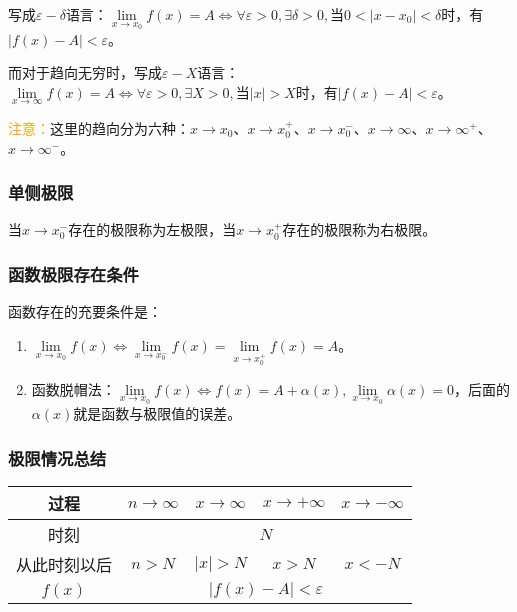 \documentclass[UTF8, 12pt]{ctexart}
\begin{document}
写成$\varepsilon-\delta$语言：$\lim\limits_{x\to x_0}f(x)=A\Leftrightarrow\forall\varepsilon>0,\exists\delta>0,\text{当}0<\vert x-x_0\vert<\delta$时，有$\vert f(x)-A\vert<\varepsilon$。

而对于趋向无穷时，写成$\varepsilon-X$语言：$\lim\limits_{x\to\infty}f(x)=A\Leftrightarrow\forall\varepsilon>0,\exists X>0,\text{当}\vert x\vert>X$时，有$\vert f(x)-A\vert<\varepsilon$。

\textcolor{orange}{注意：}这里的趋向分为六种：$x\to x_0$、$x\to x_0^+$、$x\to x_0^-$、$x\to\infty$、$x\to\infty^+$、$x\to\infty^-$。

\subsubsection{单侧极限}

当$x\to x_0^-$存在的极限称为左极限，当$x\to x_0^+$存在的极限称为右极限。

\subsubsection{函数极限存在条件}

函数存在的充要条件是：

\begin{enumerate}
    \item $\lim\limits_{x\to x_0}f(x)\Leftrightarrow\lim\limits_{x\to x_0^-}f(x)=\lim\limits_{x\to x_0^+}f(x)=A$。
    \item 函数脱帽法：$\lim\limits_{x\to x_0}f(x)\Leftrightarrow f(x)=A+\alpha(x),\lim\limits_{x\to x_0}\alpha(x)=0$，后面的$\alpha(x)$就是函数与极限值的误差。
\end{enumerate}

\subsubsection{极限情况总结}

\begin{center}
    \begin{tabular}{|c|c|c|c|c|}
        \hline
        过程 & $n\to\infty$ & $x\to\infty$ & $x\to+\infty$ & $x\to-\infty$ \\ \hline
        时刻 & \multicolumn{4}{c|}{$N$} \\ \hline
        从此时刻以后 & $n>N$ & $\vert x\vert>N$ & $x>N$ & $x<-N$ \\ \hline
        $f(x)$ & \multicolumn{4}{c|}{$\vert f(x)-A\vert<\varepsilon$} \\ 
        \hline
    \end{tabular}
\end{center}
\end{document}

